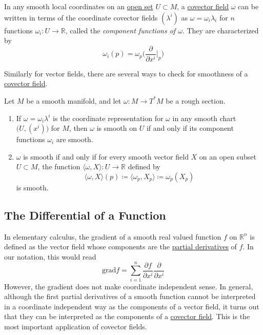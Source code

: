 \documentclass{article}
\newcounter{definition}[section]
\begin{document}
    \begin{definition}
      \label{def:component-functions-of-omega}
    In any smooth local coordinates on an \hyperref[pst-def:open-set]{open set} $U \subset M$, a \hyperref[def:covector-field]{covector field} $\omega$ can be written in terms of the coordinate covector fields $(\lambda^i)$ as $\omega = \omega_i \lambda_i$ for $n$ functions $\omega_i: U \to \mathbb{R}$, called the \textit{component functions of $\omega$}. They are characterized by 
    \begin{equation}
      \omega_i (p) = \omega_p \bigg( \frac{\partial}{\partial x^i} \bigg|_p \bigg)
    \end{equation}
    \end{definition}

    Similarly for vector fields, there are several ways to check for smoothness of a \hyperref[def:covector-field]{covector field}. 

    \begin{lemma}
      \label{thm:smoothness-criteria-for-covector-fields}
    Let $M$ be a smooth manifold, and let $\omega: M \to T^* M$ be a rough section. 
    \begin{enumerate}
        \item If $\omega = \omega_i \lambda^i$ is the coordinate representation for $\omega$ in any smooth chart $\big(U, (x^i)\big)$ for $M$, then $\omega$ is smooth on $U$ if and only if its component functions $\omega_i$ are smooth. 
        \item $\omega$ is smooth if and only if for every smooth vector field $X$ on an open subset $U \subset M$, the function $\langle \omega, X \rangle: U \to \mathbb{R}$ defined by 
        \begin{equation}
          \langle \omega, X \rangle (p) \coloneqq \langle \omega_p, X_p \rangle \coloneqq \omega_p (X_p)
        \end{equation}
        is smooth. 
    \end{enumerate}
    \end{lemma}

  \subsection{The Differential of a Function}

    In elementary calculus, the gradient of a smooth real valued function $f$ on $\mathbb{R}^n$ is defined as the vector field whose components are the \hyperref[mv-def:partial-derivative]{partial derivatives} of $f$. In our notation, this would read
    \begin{equation}
      \text{grad} f = \sum_{i=1}^n \frac{\partial f}{\partial x^i} \frac{\partial}{\partial x^i}
    \end{equation}
    However, the gradient does not make coordinate independent sense. In general, although the first partial derivatives of a smooth function cannot be interpreted in a coordinate independent way as the components of a vector field, it turns out that they can be interpreted as the components of a \hyperref[def:covector-field]{covector field}. This is the most important application of covector fields. 
\end{document}

